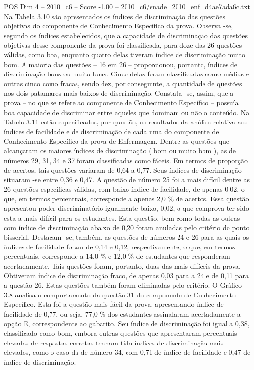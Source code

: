 \begin{textsample}{POS Dim 4 – 2010\_c6 – Score -1.00 – 2010\_c6/enade\_2010\_enf\_d4ae7ada6c.txt}
Na Tabela 3.10 são apresentados os índices de discriminação das questões objetivas do componente de Conhecimento Específico da prova.
Observa -se, segundo os índices estabelecidos, que a capacidade de discriminação das questões objetivas desse componente da prova foi classificada, para doze das 26 questões válidas, como boa, enquanto quatro delas tiveram índice de discriminação muito bom.
A maioria das questões – 16 em 26 – proporcionou, portanto, índices de discriminação bons ou muito bons.
Cinco delas foram classificadas como médias e outras cinco como fracas, sendo dez, por conseguinte, a quantidade de questões nos dois patamares mais baixos de discriminação.
Constata -se, assim, que a prova – no que se refere ao componente de Conhecimento Específico – possuía boa capacidade de discriminar entre aqueles que dominam ou não o conteúdo.
Na Tabela 3.11 estão especificados, por questão, os resultados da análise relativa aos índices de facilidade e de discriminação de cada uma do componente de Conhecimento Específico da prova de Enfermagem.
Dentre as questões que alcançaram os maiores índices de discriminação ( bom ou muito bom ), as de números 29, 31, 34 e 37 foram classificadas como fáceis.
Em termos de proporção de acertos, tais questões variaram de 0,64 a 0,77.
Seus índices de discriminação situaram -se entre 0,36 e 0,47.
A questão de número 25 foi a mais difícil dentre as 26 questões específicas válidas, com baixo índice de facilidade, de apenas 0,02, o que, em termos percentuais, corresponde a apenas 2,0 \% de acertos.
Essa questão apresentou poder discriminatório igualmente baixo, 0,02, o que comprova ter sido esta a mais difícil para os estudantes.
Esta questão, bem como todas as outras com índice de discriminação abaixo de 0,20 foram anuladas pelo critério do ponto bisserial.
Destacam -se, também, as questões de números 24 e 26 para as quais os índices de facilidade foram de 0,14 e 0,12, respectivamente, o que, em termos percentuais, corresponde a 14,0 \% e 12,0 \% de estudantes que responderam acertadamente.
Tais questões foram, portanto, duas das mais difíceis da prova.
Obtiveram índice de discriminação fraco, de apenas 0,03 para a 24 e de 0,11 para a questão 26.
Estas questões também foram eliminadas pelo critério.
O Gráfico 3.8 analisa o comportamento da questão 31 do componente de Conhecimento Específico.
Esta foi a questão mais fácil da prova, apresentando índice de facilidade de 0,77, ou seja, 77,0 \% dos estudantes assinalaram acertadamente a opção E, correspondente ao gabarito.
Seu índice de discriminação foi igual a 0,38, classificado como bom, embora outras questões que apresentaram percentuais elevados de respostas corretas tenham tido índices de discriminação mais elevados, como o caso da de número 34, com 0,71 de índice de facilidade e 0,47 de índice de discriminação.

\end{textsample}
